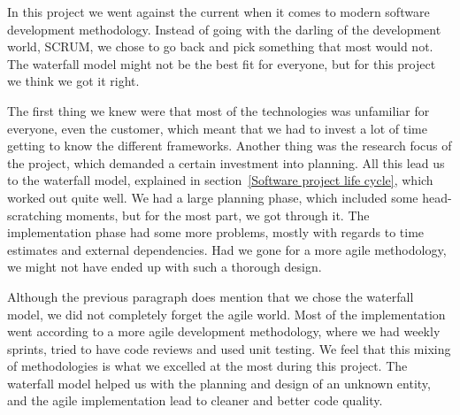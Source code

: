 In this project we went against the current when it comes to modern software development methodology. Instead of going with the darling of the development world, SCRUM, we chose to go back and pick something that most would not. The waterfall model might not be the best fit for everyone, but for this project we think we got it right.

The first thing we knew were that most of the technologies was unfamiliar for everyone, even the customer, which meant that we had to invest a lot of time getting to know the different frameworks. Another thing was the research focus of the project, which demanded a certain investment into planning. All this lead us to the waterfall model, explained in section~\ref{Software project life cycle}, which worked out quite well. We had a large planning phase, which included some head-scratching moments, but for the most part, we got through it. The implementation phase had some more problems, mostly with regards to time estimates and external dependencies. Had we gone for a more agile methodology, we might not have ended up with such a thorough design.

Although the previous paragraph does mention that we chose the waterfall model, we did not completely forget the agile world. Most of the implementation went according to a more agile development methodology, where we had weekly sprints, tried to have code reviews and used unit testing. We feel that this mixing of methodologies is what we excelled at the most during this project. The waterfall model helped us with the planning and design of an unknown entity, and the agile implementation lead to cleaner and better code quality.
